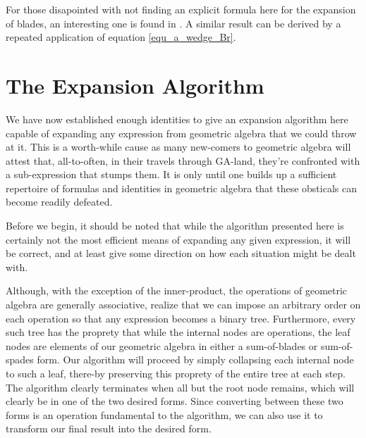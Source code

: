 \documentclass{birkjour}
\theoremstyle{definition}
\theoremstyle{remark}
\numberwithin{equation}{section}
\begin{document}
For those disapointed with not finding an explicit formula here for the expansion of blades,
an interesting one is found in \cite[p.~86]{DoranLasenby03}.  A similar result can be derived by a
repeated application of equation \eqref{equ_a_wedge_Br}.



\section{The Expansion Algorithm}

We have now established enough identities to give an expansion algorithm here capable of expanding
any expression from geometric algebra that we could throw at it.  This is a worth-while cause as many
new-comers to geometric algebra will attest that, all-to-often, in their travels through GA-land, they're
confronted with a sub-expression that stumps them.  It is only until one builds up a sufficient repertoire of
formulas and identities in geometric algebra that these obsticals can become readily defeated.

Before we begin, it should be noted that while the algorithm presented here is certainly not the most efficient
means of expanding any given expression, it will be correct, and at least give some direction on how each
situation might be dealt with.


Although, with the exception of the inner-product, the operations of geometric algebra are generally associative,
realize that we can impose an arbitrary order on each operation so that any expression becomes a binary tree.
Furthermore, every such tree has the proprety that while the internal nodes are operations, the leaf nodes
are elements of our geometric algebra in either a sum-of-blades or sum-of-spades form.  Our algorithm
will proceed by simply collapsing each internal node to such a leaf, there-by preserving this proprety of the
entire tree at each step.  The algorithm clearly terminates when all but the root node remains, which will clearly be
in one of the two desired forms.  Since converting between these two forms is an operation fundamental to
the algorithm, we can also use it to transform our final result into the desired form.
\end{document}
